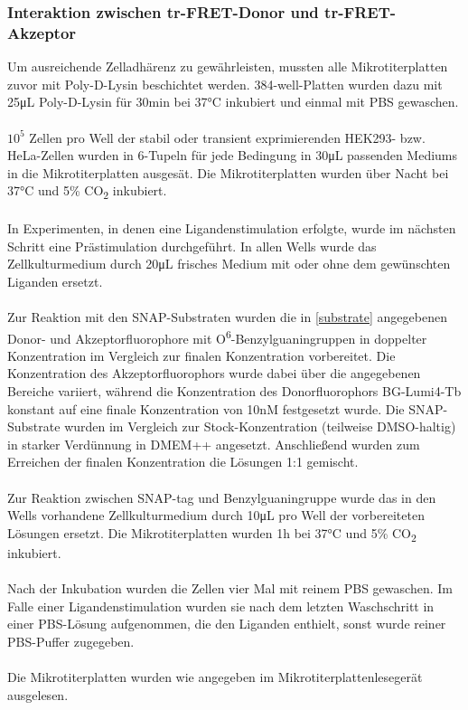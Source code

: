 \subsubsection{Interaktion zwischen tr-FRET-Donor und tr-FRET-Akzeptor}\label{interaktion}

Um ausreichende Zelladhärenz zu gewährleisten, mussten alle Mikrotiterplatten zuvor mit Poly-D-Lysin beschichtet werden. 384-well-Platten wurden dazu mit 25\si{\micro\liter} Poly-D-Lysin für 30\si{\minute} bei 37\si{\celsius} inkubiert und einmal mit PBS gewaschen.
\\ \\
$10^5$ Zellen pro Well der stabil oder transient exprimierenden HEK293- bzw. HeLa-Zellen wurden in 6-Tupeln für jede Bedingung in 30\si{\micro\liter} passenden Mediums in die Mikrotiterplatten ausgesät. Die Mikrotiterplatten wurden über Nacht bei 37\si{\celsius} und 5\% CO\textsubscript{2} inkubiert.
\\ \\
In Experimenten, in denen eine Ligandenstimulation erfolgte, wurde im nächsten Schritt eine Prästimulation durchgeführt. In allen Wells wurde das Zellkulturmedium durch 20\si{\micro\liter} frisches Medium mit oder ohne dem gewünschten Liganden ersetzt.
\\ \\
Zur Reaktion mit den SNAP-Substraten wurden die in \ref{substrate} angegebenen Donor- und Akzeptorfluorophore mit O\textsuperscript{6}-Benzylguaningruppen in doppelter Konzentration im Vergleich zur finalen Konzentration vorbereitet. Die Konzentration des Akzeptorfluorophors wurde dabei über die angegebenen Bereiche variiert, während die Konzentration des Donorfluorophors BG-Lumi4-Tb konstant auf eine finale Konzentration von 10\si{\nano M} festgesetzt wurde. Die SNAP-Substrate wurden im Vergleich zur Stock-Konzentration (teilweise DMSO-haltig) in starker Verdünnung in DMEM++ angesetzt. Anschließend wurden zum Erreichen der finalen Konzentration die Lösungen 1:1 gemischt.
\\ \\  
Zur Reaktion zwischen SNAP-tag und Benzylguaningruppe wurde das in den Wells vorhandene Zellkulturmedium durch 10\si{\micro\liter} pro Well der vorbereiteten Lösungen ersetzt. Die Mikrotiterplatten wurden 1\si{\hour} bei 37\si{\celsius} und 5\% CO\textsubscript{2} inkubiert.
\\ \\
Nach der Inkubation wurden die Zellen vier Mal mit reinem PBS gewaschen. Im Falle einer Ligandenstimulation wurden sie nach dem letzten Waschschritt in einer PBS-Lösung aufgenommen, die den Liganden enthielt, sonst wurde reiner PBS-Puffer zugegeben.
\\ \\
Die Mikrotiterplatten wurden wie angegeben im Mikrotiterplattenlesegerät ausgelesen.

